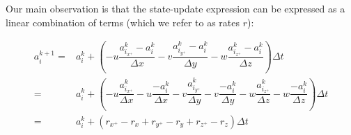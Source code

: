 \documentclass{article}
\begin{document}





\noindent Our main observation is that the state-update expression can be
expressed as a linear combination of terms (which we refer to as rates $r$):

\begin{equation} \label{eq:petri-semantics}
    \begin{split}
        a^{k+1}_{i}  = & a^{k}_{i} +  \left(-u\dfrac{a^{k}_{i_{x^+}} - a^{k}_{i}}{\Delta x} -v\dfrac{a^{k}_{i_{y^+}} - a^{k}_{i}}{\Delta y} -w\dfrac{a^{k}_{i_{z^+}} - a^{k}_{i}}{\Delta z}\right) \Delta t\\
        = &  a^{k}_{i} +  \left(-u\dfrac{a^{k}_{i_{x^+}}}{\Delta x} -u\dfrac{- a^{k}_{i}}{\Delta x} -v\dfrac{a^{k}_{i_{y^+}} }{\Delta y} -v\dfrac{ - a^{k}_{i}}{\Delta y} -w\dfrac{a^{k}_{i_{z^+}} }{\Delta z} -w\dfrac{ - a^{k}_{i}}{\Delta z}\right) \Delta t\\
        = &  a^{k}_{i} +  \left(r_{x^+} -r_x  + r_{y^+} -r_y + r_{z^+} -r_z\right) \Delta t
    \end{split}
\end{equation}
\end{document}
